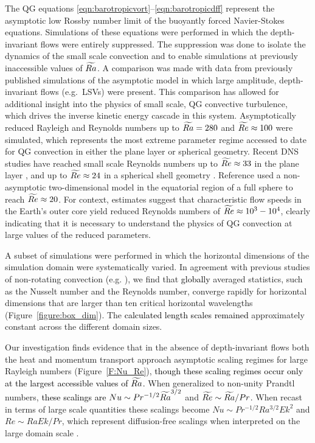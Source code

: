 The QG equations  \eqref{eqn:barotropicvort}--\eqref{eqn:barotropicdff} represent the asymptotic low Rossby number limit of the buoyantly forced Navier-Stokes equations. 
Simulations of these equations were performed in which the depth-invariant flows 
were entirely suppressed. 
The suppression was done to isolate the dynamics of the small scale convection and to enable simulations at previously inaccessible values of $\widetilde{Ra}$. A comparison was made with data from previously published simulations of the asymptotic model in which large amplitude, depth-invariant flows (e.g.~LSVs) were present. 
This comparison has allowed for additional insight into the physics of small scale, QG convective turbulence, which drives the inverse kinetic energy cascade in this system. Asymptotically reduced Rayleigh and Reynolds numbers up to $\widetilde{Ra} = 280$ and $\widetilde{Re} \approx 100$ were simulated, which represents the most extreme parameter regime accessed to date for QG convection in either the plane layer or spherical geometry. 
Recent DNS studies have reached small scale Reynolds numbers up to $\widetilde{Re} \approx 33$ in the plane layer \citep{mY22a,mY22}, and up to $\widetilde{Re} \approx 24$ in a spherical shell geometry \citep{nS17}. Reference \cite{cG19} used a non-asymptotic two-dimensional model in the equatorial region of a full sphere to reach $\widetilde{Re} \approx 20$. For context, estimates suggest that characteristic flow speeds in the Earth's outer core yield reduced Reynolds numbers of $\widetilde{Re} \approx 10^3-10^4$, clearly indicating that it is necessary to understand the physics of QG convection at large values of the reduced parameters. 

A subset of simulations were performed in which the horizontal dimensions of the simulation domain were systematically varied.
In agreement with previous studies of non-rotating convection (e.g. \citep{rS18}), we find that \textcolor{black}{globally}
averaged statistics, such as the Nusselt number and the Reynolds number, converge rapidly for horizontal dimensions that are larger than ten critical horizontal wavelengths (Figure~\ref{figure:box_dim}). 
The \textcolor{black}{calculated length scales remained} approximately constant across the different domain sizes. 


Our investigation finds evidence that in the absence of depth-invariant flows both the heat and momentum transport approach asymptotic scaling regimes for large Rayleigh numbers (Figure~\ref{F:Nu_Re}), \textcolor{black}{though these scaling regimes occur only at the largest accessible values of $\widetilde{Ra}$.} When generalized to non-unity Prandtl numbers, \textcolor{black}{these scalings are} $Nu \sim Pr^{-1/2}\widetilde{Ra}^{3/2}$ and $\widetilde{Re} \sim \widetilde{Ra}/Pr$. 
When recast in terms of large scale quantities these scalings become $Nu \sim Pr^{-1/2} Ra^{3/2} Ek^2$ and $Re \sim Ra Ek/Pr$, which represent diffusion-free scalings when interpreted on the large domain scale \citep{jmA20}.


